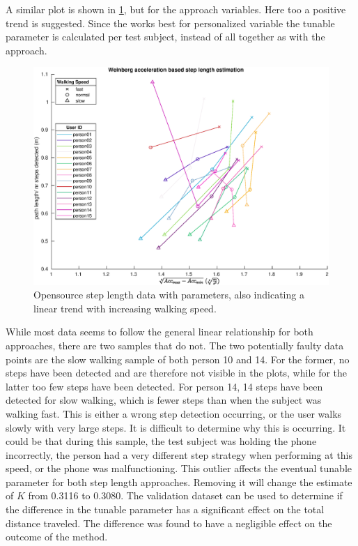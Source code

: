 A similar plot is shown in \cref{fig:step_length_weinberg}, but for the \citet{Weinberg2002} approach variables. Here too a positive trend is suggested. Since the \citet{Weinberg2002} works best for personalized variable the tunable parameter is calculated per test subject, instead of all together as with the \citet{Tian2016} approach. 

\begin{figure}[H]
	\centering
	\includegraphics[width=0.8\linewidth]{images/20201113_1639_weinberg}
	\caption{Opensource step length data with \citet{Weinberg2002} parameters, also indicating a linear trend with increasing walking speed.}
	\label{fig:step_length_weinberg}
\end{figure}

While most data seems to follow the general linear relationship for both approaches, there are two samples that do not. The two potentially faulty data points are the slow walking sample of both person 10 and 14. For the former, no steps have been detected and are therefore not visible in the plots, while for the latter too few steps have been detected. For person 14, 14 steps have been detected for slow walking, which is fewer steps than when the subject was walking fast. This is either a wrong step detection occurring, or the user walks slowly with very large steps. It is difficult to determine why this is occurring. It could be that during this sample, the test subject was holding the phone incorrectly, the person had a very different step strategy when performing at this speed, or the phone was malfunctioning. This outlier affects the eventual tunable parameter for both step length approaches. Removing it will change the estimate of $K$ from 0.3116 to 0.3080. The validation dataset can be used to determine if the difference in the tunable parameter has a significant effect on the total distance traveled. The difference was found to have a negligible effect on the outcome of the method.

